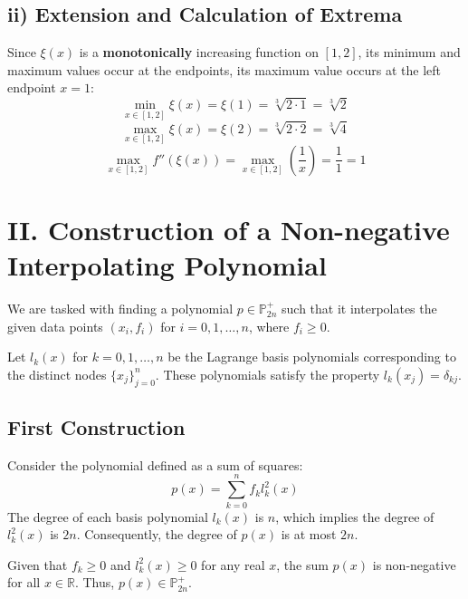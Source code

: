 \documentclass[a4paper]{article}
\begin{document}
\subsection*{ii) Extension and Calculation of Extrema}
Since $\xi(x)$ is a \textbf{monotonically} increasing function on $[1, 2]$, its minimum and maximum values occur at the endpoints,  its maximum value occurs at the left endpoint $x=1$:
\[
\min_{x \in [1, 2]} \xi(x) = \xi(1) = \sqrt[3]{2 \cdot 1} = \sqrt[3]{2}
\]
\[
\max_{x \in [1, 2]} \xi(x) = \xi(2) = \sqrt[3]{2 \cdot 2} = \sqrt[3]{4}
\]
\[
\max_{x \in [1, 2]} f''(\xi(x)) = \max_{x \in [1, 2]} \left(\frac{1}{x}\right) = \frac{1}{1} = 1
\]




\section*{II. Construction of a Non-negative Interpolating Polynomial}

We are tasked with finding a polynomial $p \in \mathbb{P}_{2n}^+$ such that it interpolates the given data points $(x_i, f_i)$ for $i=0, 1, \dots, n$, where $f_i \ge 0$.

Let $l_k(x)$ for $k=0, 1, \dots, n$ be the Lagrange basis polynomials corresponding to the distinct nodes $\{x_j\}_{j=0}^n$. These polynomials satisfy the property $l_k(x_j) = \delta_{kj}$.

\subsection*{First Construction}

Consider the polynomial defined as a sum of squares:
\[
p(x) = \sum_{k=0}^{n} f_k l_k^2(x)
\]
The degree of each basis polynomial $l_k(x)$ is $n$, which implies the degree of $l_k^2(x)$ is $2n$. Consequently, the degree of $p(x)$ is at most $2n$.

Given that $f_k \ge 0$ and $l_k^2(x) \ge 0$ for any real $x$, the sum $p(x)$ is non-negative for all $x \in \mathbb{R}$. Thus, $p(x) \in \mathbb{P}_{2n}^+$.
\end{document}
